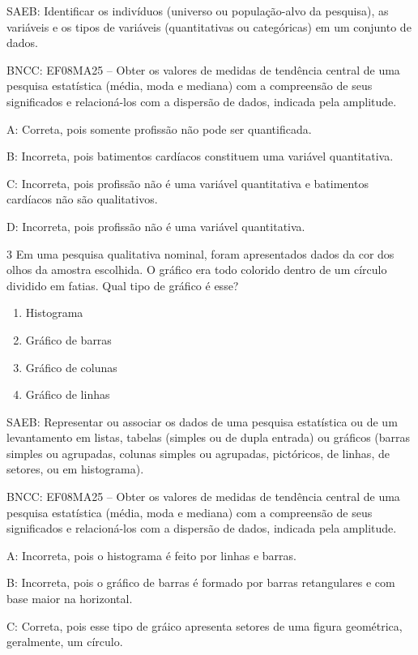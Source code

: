 {SAEB: Identificar os indivíduos (universo ou população-alvo da
pesquisa), as variáveis e os tipos de variáveis (quantitativas ou
categóricas) em um conjunto de dados.

BNCC: EF08MA25 -- Obter os valores de medidas de tendência central de
uma pesquisa estatística (média, moda e mediana) com a compreensão de
seus significados e relacioná-los com a dispersão de dados, indicada
pela amplitude.

A: Correta, pois somente profissão não pode ser quantificada.

B: Incorreta, pois batimentos cardíacos constituem uma variável
quantitativa.

C: Incorreta, pois profissão não é uma variável quantitativa e
batimentos cardíacos não são qualitativos.

D: Incorreta, pois profissão não é uma variável quantitativa.

\num{3} Em uma pesquisa qualitativa nominal, foram apresentados dados da cor
dos olhos da amostra escolhida. O gráfico era todo colorido dentro de um
círculo dividido em fatias. Qual tipo de gráfico é esse?

\begin{enumerate}
\def\labelenumi{\alph{enumi}.}
\item
  Histograma
\item
  Gráfico de barras
\item
  Gráfico de colunas
\item
  Gráfico de linhas~
\end{enumerate}

SAEB: Representar ou associar os dados de uma pesquisa estatística ou de
um levantamento em listas, tabelas (simples ou de dupla entrada) ou
gráficos (barras simples ou agrupadas, colunas simples ou agrupadas,
pictóricos, de linhas, de setores, ou em histograma).

BNCC: EF08MA25 -- Obter os valores de medidas de tendência central de
uma pesquisa estatística (média, moda e mediana) com a compreensão de
seus significados e relacioná-los com a dispersão de dados, indicada
pela amplitude.

A: Incorreta, pois o histograma é feito por linhas e barras.

B: Incorreta, pois o gráfico de barras é formado por barras retangulares
e com base maior na horizontal.

C: Correta, pois esse tipo de gráico apresenta setores de uma figura
geométrica, geralmente, um círculo.

}
